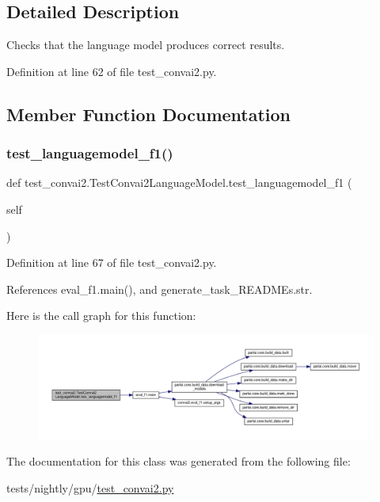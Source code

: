 \subsection{Detailed Description}
\begin{DoxyVerb}Checks that the language model produces correct results.
\end{DoxyVerb}
 

Definition at line 62 of file test\+\_\+convai2.\+py.



\subsection{Member Function Documentation}
\mbox{\label{classtest__convai2_1_1TestConvai2LanguageModel_a854c13ca56bdf47737d0e54a5e012405}} 
\subsubsection{\texorpdfstring{test\+\_\+languagemodel\+\_\+f1()}{test\_languagemodel\_f1()}}
{\footnotesize\ttfamily def test\+\_\+convai2.\+Test\+Convai2\+Language\+Model.\+test\+\_\+languagemodel\+\_\+f1 (\begin{DoxyParamCaption}\item[{}]{self }\end{DoxyParamCaption})}



Definition at line 67 of file test\+\_\+convai2.\+py.



References eval\+\_\+f1.\+main(), and generate\+\_\+task\+\_\+\+R\+E\+A\+D\+M\+Es.\+str.

Here is the call graph for this function\+:
\nopagebreak
\begin{figure}[H]
\begin{center}
\leavevmode
\includegraphics[width=350pt]{classtest__convai2_1_1TestConvai2LanguageModel_a854c13ca56bdf47737d0e54a5e012405_cgraph}
\end{center}
\end{figure}


The documentation for this class was generated from the following file\+:\begin{DoxyCompactItemize}
\item 
tests/nightly/gpu/\hyperlink{test__convai2_8py}{test\+\_\+convai2.\+py}\end{DoxyCompactItemize}
